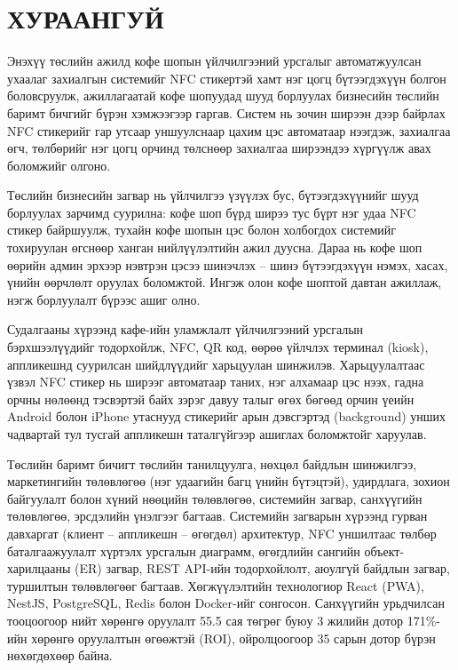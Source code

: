 \chapter*{ХУРААНГУЙ}

Энэхүү төслийн ажилд кофе шопын үйлчилгээний урсгалыг автоматжуулсан
ухаалаг захиалгын системийг NFC стикертэй хамт нэг цогц бүтээгдэхүүн
болгон боловсруулж, ажиллагаатай кофе шопуудад шууд борлуулах
бизнесийн төслийн баримт бичгийг бүрэн хэмжээгээр гаргав. Систем нь
зочин ширээн дээр байрлах NFC стикерийг гар утсаар уншуулснаар цахим
цэс автоматаар нээгдэж, захиалгаа өгч, төлбөрийг нэг цогц орчинд
төлснөөр захиалгаа ширээндээ хүргүүлж авах боломжийг олгоно.

Төслийн бизнесийн загвар нь үйлчилгээ үзүүлэх бус, бүтээгдэхүүнийг шууд
борлуулах зарчимд суурилна: кофе шоп бүрд ширээ тус бүрт нэг удаа NFC
стикер байршуулж, тухайн кофе шопын цэс болон холбогдох системийг
тохируулан өгснөөр ханган нийлүүлэлтийн ажил дуусна. Дараа нь кофе
шоп өөрийн админ эрхээр нэвтрэн цэсээ шинэчлэх -- шинэ бүтээгдэхүүн
нэмэх, хасах, үнийн өөрчлөлт оруулах боломжтой. Ингэж олон кофе шоптой
давтан ажиллаж, нэгж борлуулалт бүрээс ашиг олно.

Судалгааны хүрээнд кафе-ийн уламжлалт үйлчилгээний урсгалын бэрхшээлүүдийг
тодорхойлж, NFC, QR код, өөрөө үйлчлэх терминал (kiosk), аппликешнд
суурилсан шийдлүүдийг харьцуулан шинжилэв. Харьцуулалтаас үзвэл NFC стикер
нь ширээг автоматаар таних, нэг алхамаар цэс нээх, гадна орчны нөлөөнд
тэсвэртэй байх зэрэг давуу талыг өгөх бөгөөд орчин үеийн Android болон
iPhone утаснууд стикерийг арын дэвсгэртэд (background) унших чадвартай
тул тусгай аппликешн таталгүйгээр ашиглах боломжтойг харуулав.

Төслийн баримт бичигт төслийн танилцуулга, нөхцөл байдлын шинжилгээ,
маркетингийн төлөвлөгөө (нэг удаагийн багц үнийн бүтэцтэй), удирдлага,
зохион байгуулалт болон хүний нөөцийн төлөвлөгөө, системийн загвар,
санхүүгийн төлөвлөгөө, эрсдэлийн үнэлгээг багтаав. Системийн загварын
хүрээнд гурван давхаргат (клиент -- аппликешн -- өгөгдөл) архитектур,
NFC уншилтаас төлбөр баталгаажуулалт хүртэлх урсгалын диаграмм,
өгөгдлийн сангийн объект-харилцааны (ER) загвар, REST API-ийн
тодорхойлолт, аюулгүй байдлын загвар, туршилтын төлөвлөгөөг
багтаав. Хөгжүүлэлтийн технологиор React (PWA), NestJS, PostgreSQL,
Redis болон Docker-ийг сонгосон. Санхүүгийн урьдчилсан тооцоогоор
нийт хөрөнгө оруулалт 55.5 сая төгрөг буюу 3 жилийн дотор 171\%-ийн
хөрөнгө оруулалтын өгөөжтэй (ROI), ойролцоогоор 35 сарын дотор
бүрэн нөхөгдөхөөр байна.

